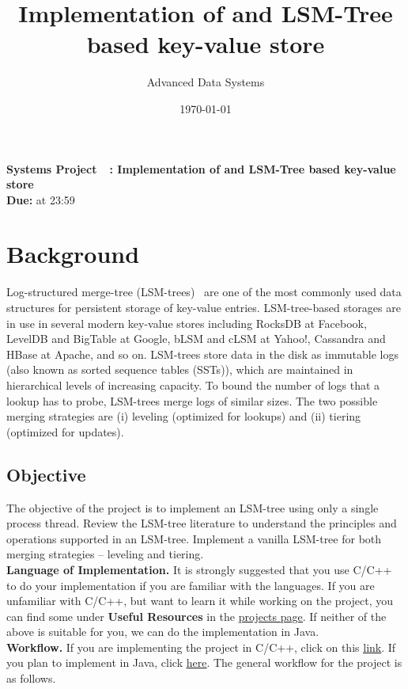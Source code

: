 \documentclass[12pt,a4paper,twoside]{article}
\title{Implementation of and LSM-Tree based key-value store}
\author{Advanced Data Systems}
\date{\today}
\newcommand{\assignmenttype}{Systems Project}       %
\newcommand{\assignmentnumber}{\hspace{-0.2em}}           %
\newcommand{\smallspace}{0.2cm}
\begin{document}
\begin{center}
    \textbf{\assignmenttype\ \assignmentnumber\ \:: Implementation of and LSM-Tree based key-value store}\\
    \vspace{\smallspace}
    \textbf{Due:}  at 23:59
\end{center}



\section*{Background}
Log-structured merge-tree (LSM-trees)~\cite{CLMJLSM2020, NDMASIMONKEY2017, POECDGEJLSM1996} are one of the most commonly used data structures for persistent storage of key-value entries.
LSM-tree-based storages are in use in several modern key-value stores including RocksDB at Facebook, LevelDB and BigTable at Google, bLSM and cLSM at Yahoo!, Cassandra and HBase at Apache, and so on.
LSM-trees store data in the disk as immutable logs (also known as sorted sequence tables (SSTs)), which are maintained in hierarchical levels of increasing capacity.
To bound the number of logs that a lookup has to probe, LSM-trees merge logs of similar sizes.
The two possible merging strategies are (i) leveling (optimized for lookups) and (ii) tiering (optimized for updates).

\subsection*{Objective}
The objective of the project is to implement an LSM-tree using only a single process thread. 
Review the LSM-tree literature to understand the principles and operations supported in an LSM-tree.
Implement a vanilla LSM-tree for both merging strategies \--- leveling and tiering. \\

\noindent \textbf{Language of Implementation.} It is strongly suggested that you use C/C++ to do your implementation if you are familiar with the languages. 
If you are unfamiliar with C/C++, but want to learn it while working on the project, you can find some under \textbf{Useful Resources} in the \href{https://ssd-brandeis.github.io/COSI-167A/assignments/}{\underline{projects page}}. 
If neither of the above is suitable for you, we can do the implementation in Java. \\

\noindent \textbf{Workflow.} If you are implementing the project in C/C++, click on this \href{https://github.com/SSD-Brandeis/LSMTree-DataStore-CPP}{\underline{link}}. 
If you plan to implement in Java, click \href{https://github.com/SSD-Brandeis/LSMTree-DataStore-Java}{\underline{here}}. 
The general workflow for the project is as follows.
\end{document}
